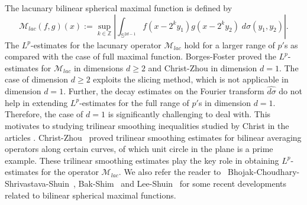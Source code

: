 \documentclass[a4paper,reqno]{amsart}
\theoremstyle{definition}
\theoremstyle{remark}
\numberwithin{equation}{section}
\newcommand{\Z}{{\mathbb Z}}
\begin{document}
	The lacunary bilinear spherical maximal function is defined by 
	\[\mathcal{M}_{lac}(f,g)(x):=\sup_{k\in \Z}\left|\int_{\mathbb S^{2d-1}}f(x-2^ky_1)g(x-2^ky_2)\;d\sigma(y_1,y_2)\right|.\]
	The $L^p$-estimates for the lacunary operator $\mathcal{M}_{lac}$ hold for a larger range of $p'$s as compared with the case of full maximal function. Borges-Foster \cite{Borges} proved the $L^p$-estimates for $\mathcal{M}_{lac}$ in dimensions $d\geq2$ and Christ-Zhou \cite{ChristZhou} in dimension $d=1$. The case of dimension $d\geq 2$ exploits the slicing method, which is not applicable in dimension $d=1$. Further, the decay estimates on the Fourier transform $\widehat{d\sigma}$ do not help in extending $L^p$-estimates for the full range of $p'$s in dimension $d=1$. Therefore, the case of $d=1$ is significantly challenging to deal with. This motivates to studying trilinear smoothing inequalities studied by Christ in the articles \cite{Christ2, Christ3, Christ1}. Christ-Zhou~\cite{ChristZhou} proved trilinear smoothing estimates for bilinear averaging operators along certain curves, of which unit circle in the plane is a prime example. These trilinear smoothing estimates play the key role in obtaining $L^p$-estimates for the operator $\mathcal{M}_{lac}$. We also refer the reader to ~Bhojak-Choudhary-Shrivastava-Shuin~\cite{BCSS1}, Bak-Shim~\cite{BakShim} and Lee-Shuin~\cite{LeeShuin} for some recent developments related to bilinear spherical maximal functions. 
	
\end{document}
